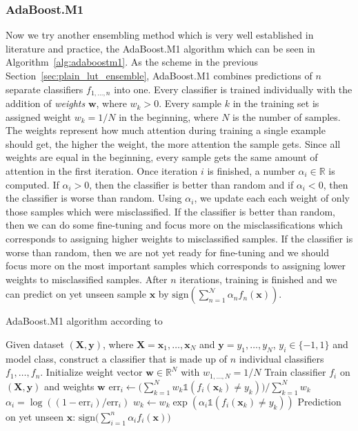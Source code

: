 \subsubsection{AdaBoost.M1} \label{sec:ada_boost}
Now we try another ensembling method which is very well established in literature and practice, the AdaBoost.M1 algorithm \cite{bib:adaboostm1} which can be seen in Algorithm~\ref{alg:adaboostm1}. As the scheme in the previous Section~\ref{sec:plain_lut_ensemble}, AdaBoost.M1 combines predictions of $n$ separate classifiers $f_{1, \dots, n}$ into one. Every classifier is trained individually with the addition of \textit{weights} $\bm{w}$, where $w_k > 0$. Every sample $k$ in the training set is assigned weight $w_k = 1/N$ in the beginning, where $N$ is the number of samples. The weights represent how much attention during training a single example should get, the higher the weight, the more attention the sample gets. Since all weights are equal in the beginning, every sample gets the same amount of attention in the first iteration. Once iteration $i$ is finished, a number $\alpha_i \in \mathds{R}$ is computed. If $\alpha_i > 0$, then the classifier is better than random and if $\alpha_i < 0$, then the classifier is worse than random. Using $\alpha_i$, we update each each weight of only those samples which were misclassified. If the classifier is better than random, then we can do some fine-tuning and focus more on the misclassifications which corresponds to assigning higher weights to misclassified samples. If the classifier is worse than random, then we are not yet ready for fine-tuning and we should focus more on the most important samples which corresponds to assigning lower weights to misclassified samples. After $n$ iterations, training is finished and we can predict on yet unseen sample $\bm{x}$ by $\text{sign}(\sum_{n=1}^{\mathcal{N}} \alpha_n f_n(\bm{x}))$. 

\begin{algorithm}
  \caption{AdaBoost.M1 algorithm according to \cite{bib:adaboostm1}} \label{alg:adaboostm1}
  \begin{algorithmic}[1]
    \State Given dataset $(\bm{X}, \bm{y})$, where $\bm{X} = \bm{x}_1, \dots, \bm{x}_N$ and $\bm{y} = y_1, \dots, y_N$, $y_i \in \{-1, 1\}$ and model class, construct a classifier that is made up of $n$ individual classifiers $f_1, \dots, f_n$.
    \vspace{1em}
    \State Initialize weight vector $\bm{w} \in \mathds{R}^N$ with $w_{1, \dots, N} = 1/N$
    \vspace{0.5em}
    \State Train classifier $f_i$ on $(\bm{X},\bm{y})$ and weights $\bm{w}$ \label{alg_line:adaboostm1:train}
    \State $\text{err}_i \gets \big( \sum_{k=1}^N w_k \mathbb{1}(f_i(\bm{x}_k) \neq y_k) \big) / \sum_{k=1}^N w_k$
    \State $\alpha_i = \log((1 - \text{err}_i) / \text{err}_i)$
    \State $w_k \gets w_k \exp(\alpha_i \mathbb{1}(f_i(\bm{x}_k) \neq y_k))$
    \EndFor
    \EndFor
    \State Prediction on yet unseen $\bm{x}$: $\text{sign} \big( \sum_{i = 1}^n \alpha_i f_i(\bm{x}) \big)$
  \end{algorithmic}
\end{algorithm}
\FloatBarrier

